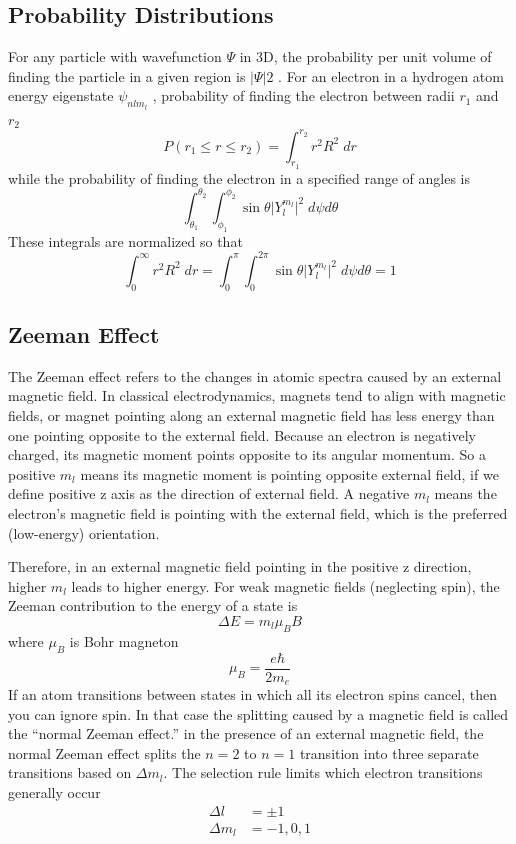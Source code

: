 \documentclass[../../main.tex]{subfiles}
\begin{document}
\subsection{Probability Distributions}
For any particle with wavefunction $\Psi$ in 3D, the probability per unit volume of finding the particle in a given region is $|\Psi|2$ . For an electron in a hydrogen atom energy eigenstate $\psi_{nlm_l}$ , probability of finding the electron between radii $r_1$ and $r_2$
\begin{equation*}
    P(r_1 \leq r \leq r_2)= \int_{r_1}^{r_2}r^2R^2\;dr
\end{equation*}
while the probability of finding the electron in a specified range of angles is
\begin{equation*}
    \int_{\theta_1}^{\theta_2}\int_{\phi_1}^{\phi_2} \sin\theta \big| Y_l^{m_l}\big|^2\;d\psi d\theta
\end{equation*}
These integrals are normalized so that
\begin{equation*}
    \int_{0}^{\infty}r^2R^2\;dr = \int_{0}^{\pi}\int_{0}^{2\pi} \sin\theta \big| Y_l^{m_l}\big|^2\;d\psi d\theta =1
\end{equation*}

\subsection{Zeeman Effect} 
The Zeeman effect refers to the changes in atomic spectra caused by an external magnetic field. In classical electrodynamics, magnets tend to align with magnetic fields, or magnet pointing along an external magnetic field has less energy than one pointing opposite to the external field. Because an electron is negatively charged, its magnetic moment points opposite to its angular momentum. So a positive $m_l$ means its magnetic moment is pointing opposite external field, if we define positive z axis as the direction of external field. A negative $m_l$ means the electron's magnetic field is pointing with the external field, which is the preferred (low-energy) orientation.

Therefore, in an external magnetic field pointing in the positive z direction, higher $m_l$ leads to higher energy. For weak magnetic fields (neglecting spin), the Zeeman contribution to the energy of a state is
\begin{equation*}
    \Delta E=m_l\mu_BB
\end{equation*}
where $\mu_B$ is Bohr magneton
\begin{equation*}
    \mu_B=\frac{e\hbar}{2m_e}
\end{equation*}
If an atom transitions between states in which all its electron spins cancel, then you can ignore spin. In that case the splitting caused by a magnetic field is called the “normal Zeeman effect.” in the presence of an external magnetic field, the normal Zeeman effect splits the $n = 2$ to $n = 1$ transition into three separate transitions based on $\Delta m_l$. The selection rule limits which electron transitions generally occur
\begin{align*}
    \Delta l&=\pm 1\\
    \Delta m_l&=-1,0,1
\end{align*}
\end{document}
